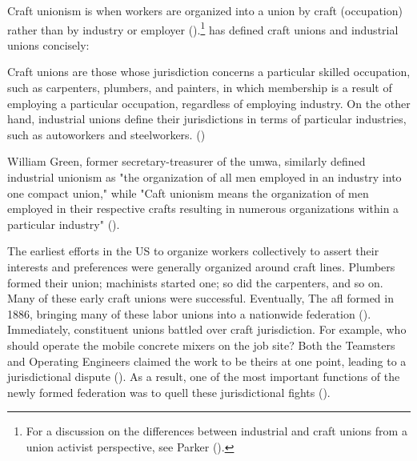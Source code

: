\documentclass[12pt]{article}
\renewenvironment{quote}
  {\list{}{\leftmargin=\parindent\rightmargin=0pt}%
   \item\relax}
  {\endlist}
\begin{document}
Craft unionism is when workers are organized into a union by craft (occupation) rather than by industry or employer (\cite[97]{suffernCraftVsIndustrial1936}).\footnote{For a discussion on the differences between industrial and craft unions from a union activist perspective, see Parker (\citeyear{parkerAreIndustrialUnions2008}).} \citeauthor{ohCraftIndustrialUnions1989} has defined craft unions and industrial unions concisely:

\begin{quote}
Craft unions are those whose jurisdiction concerns a particular skilled occupation, such as carpenters, plumbers, and painters, in which membership is a result of employing a particular occupation, regardless of employing industry. On the other hand, industrial unions define their jurisdictions in terms of particular industries, such as autoworkers and steelworkers. (\citeyear[2]{ohCraftIndustrialUnions1989})
\end{quote}

\noindent William Green, former secretary-treasurer of the \acrfull{umwa}, similarly defined industrial unionism as "the organization of all men employed in an industry into one compact union," while "Caft unionism means the organization of men employed in their respective crafts resulting in numerous organizations within a particular industry" (\cite[69–70]{sapossIndustrialUnionism1935}).

The earliest efforts in the US to organize workers collectively to assert their interests and preferences were generally organized around craft lines. Plumbers formed their union; machinists started one; so did the carpenters, and so on. Many of these early craft unions were successful. Eventually, The \acrfull{afl} formed in 1886, bringing many of these labor unions into a nationwide federation (\cite[97]{suffernCraftVsIndustrial1936}). Immediately, constituent unions battled over craft jurisdiction. For example, who should operate the mobile concrete mixers on the job site? Both the Teamsters and Operating Engineers claimed the work to be theirs at one point, leading to a jurisdictional dispute (\cite{jaffe1940}). As a result, one of the most important functions of the newly formed federation was to quell these jurisdictional fights (\cite{jaffe1940}).

\end{document}
